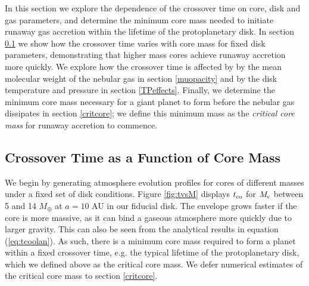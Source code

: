 \documentclass[apj]{emulateapj}
\begin{document}
In this section we explore the dependence of the crossover time on core, disk and gas parameters, and determine the minimum core mass needed to initiate runaway gas accretion within the lifetime of the protoplanetary disk. In section \ref{Mct} we show how the crossover time varies with core mass for fixed disk parameters, demonstrating that higher mass cores achieve runaway accretion more quickly. We explore how the crossover time is affected by by the mean molecular weight of the nebular gas in section \ref{muopacity} and by the disk temperature and pressure in section \ref{TPeffects}. Finally, we determine the minimum core mass necessary for a giant planet to form before the nebular gas dissipates in section \ref{critcore}; we define this minimum mass as the \textit{critical core mass} for runaway accretion to commence. 




\subsection{Crossover Time as a Function of Core Mass}
\label{Mct}

We begin by generating atmosphere evolution profiles for cores of different masses under a fixed set of disk conditions. Figure \ref{fig:tvsM} displays $t_{\rm{co}}$ for $M_{\rm c}$ between 5 and 14 $M_{\oplus}$ at $a=10$ AU in our fiducial disk. The envelope grows faster if the core is more massive, as it can bind a gaseous atmosphere more quickly due to larger gravity. This can also be seen from the analytical results in equation (\ref{eq:tcoolan}). As such, there is a minimum core mass required to form a planet within a fixed crossover time, e.g. the typical lifetime of the protoplanetary disk, which we defined above as the critical core mass. We defer numerical estimates of the critical core mass to section \ref{critcore}.
\end{document}
